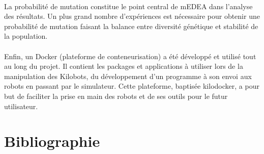 \documentclass[a4paper]{article}
\begin{document}
\\La probabilité de mutation constitue le point central de mEDEA dans l'analyse des résultats. Un plus grand nombre d'expériences est nécessaire pour obtenir une probabilité de mutation faisant la balance entre diversité génétique et stabilité de la population.
\\ \\Enfin, un Docker (plateforme de conteneurisation) a été développé et utilisé tout au long du projet. Il contient les packages et applications à utiliser lors de la manipulation des Kilobots, du développement d'un programme à son envoi aux robots en passant par le simulateur. Cette plateforme, baptisée kilodocker, a pour but de faciliter la prise en main des robots et de ses outils pour le futur utilisateur.
\newpage
\section{Bibliographie}
\renewcommand{\refname}{Références}
\printbibliography
\end{document}
